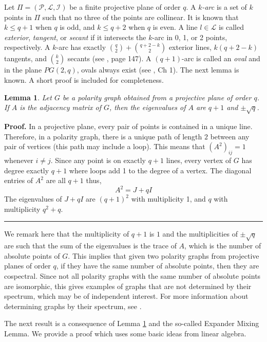 \documentclass[12pt]{article}
\newtheorem{lemma}[theorem]{Lemma}
\newenvironment{proof}[1][Proof]{\noindent\textbf{#1.} }
{\hfill \ \rule{0.5em}{0.5em}}
\begin{document}
Let $\Pi = ( \mathcal{P} , \mathcal{L} , \mathcal{I} )$ be a finite projective plane of order $q$.  A {\em $k$-arc} is a set of $k$ points
in $\Pi$ such that no three of the points are collinear.  It is known that $k \leq q +1$ when $q$ is odd, and $k \leq q + 2$ when $q$ is even.  A line $l \in \mathcal{L}$ is called {\em exterior}, {\em tangent}, or {\em secant} if it intersects the $k$-arc in 0, 1, or 2 points, respectively.  A $k$-arc has exactly $\binom{q}{2} + \binom{q + 2 - k }{2}$ exterior lines, $k ( q+ 2 - k )$ tangents, and $\binom{k}{2}$ secants (see \cite{dembowski1968finite}, page 147).  A $(q+1)$-arc is called an {\em oval} and in the plane $PG(2,q)$, ovals always exist (see \cite{dembowski1968finite}, Ch 1).  The next lemma is known.  A short proof is included for completeness.

\begin{lemma}\label{eigen of graph}
    Let $G$ be a polarity graph obtained from a projective plane of order $q$.  If $A$ is the adjacency matrix of $G$, then the eigenvalues of $A$ are $q+1$ and $\pm \sqrt{q}$.
\end{lemma}


\begin{proof}
    In a projective plane, every pair of points is contained in a unique line. Therefore, in a polarity graph, there is a unique path of length $2$ between any pair of vertices (this path may include a loop). This means that $(A^2)_{ij} = 1$ whenever $i\not=j$. Since any point is on exactly $q+1$ lines, every vertex of $G$ has degree exactly $q+1$ where loops add 1 to the degree of a vertex. The diagonal entries of $A^2$ are all $q+1$ thus,
    $$ A^2 = J + qI $$
    The eigenvalues of $J+qI$ are $(q+1)^2$ with multiplicity 1, and $q$ with multiplicity $q^2 + q$.
\end{proof}

We remark here that the multiplicity of $q+1$ is $1$ and the multiplicities of $\pm \sqrt{q}$ are such that the sum of the eigenvalues is the trace of $A$, which is the number of absolute points of $G$. This implies that given two polarity graphs from projective planes of order $q$, if they have the same number of absolute points, then they are cospectral. Since not all polarity graphs with the same number of absolute points are isomorphic, this gives examples of graphs that are not determined by their spectrum, which may be of independent interest. For more information about determining graphs by their spectrum, see \cite{van2003graphs}.


The next result is a consequence of Lemma \ref{eigen of graph} and the so-called Expander Mixing Lemma.
We provide a proof which uses some basic ideas from linear algebra.
\end{document}
